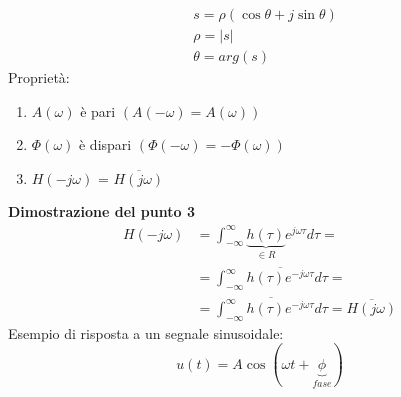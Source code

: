 \documentclass[a4paper, 12pt]{book}
\theoremstyle{plain}
\begin{document}
\begin{figure}[h!]
    \centering
    \quad
\end{figure}
\[
    \begin{split}
        &s = \rho(\cos \theta + j \sin \theta) \\
        &\rho = |s| \\
        &\theta = arg(s)
    \end{split}
\]
Proprietà:
\begin{enumerate}
    \item $A(\omega)$ è pari $(A(-\omega) = A(\omega))$
    \item $\Phi(\omega)$ è dispari $(\Phi(-\omega) = -\Phi(\omega))$
    \item $H(-j\omega)$ = $\overline{H(j\omega)}$ 
\end{enumerate}
\textbf{Dimostrazione del punto 3}
\[
    \begin{split}
        H(-j \omega) &= \int_{-\infty}^\infty \underbrace{h(\tau)}_{\in R} e^{j \omega \tau} d \tau = \\
        &= \int_{-\infty}^\infty \overline{h(\tau) e^{-j \omega \tau}} d \tau = \\
        &= \overline{\int_{-\infty}^\infty h(\tau) e^{-j \omega \tau} d \tau} = \overline{H(j \omega)}
    \end{split}
\]
Esempio di risposta a un segnale sinusoidale:
\[
    u(t) = A \cos (\omega t + \underbrace{\phi}_{fase})
\]
\end{document}
